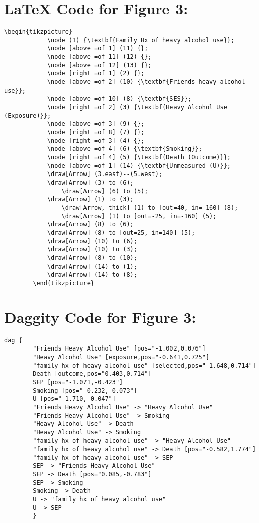 \documentclass{article}
\begin{document}
\section*{\LaTeX\hspace*{1mm} Code for Figure 3:}
    \begin{lstlisting}[frame=single, basicstyle=\ttfamily, linewidth=20.5cm]
        \begin{tikzpicture}
            \node (1) {\textbf{Family Hx of heavy alcohol use}};
            \node [above =of 1] (11) {};
            \node [above =of 11] (12) {};
            \node [above =of 12] (13) {};
            \node [right =of 1] (2) {};
            \node [above =of 2] (10) {\textbf{Friends heavy alcohol use}};
            \node [above =of 10] (8) {\textbf{SES}};
            \node [right =of 2] (3) {\textbf{Heavy Alcohol Use (Exposure)}};
            \node [above =of 3] (9) {};
            \node [right =of 8] (7) {};
            \node [right =of 3] (4) {};
            \node [above =of 4] (6) {\textbf{Smoking}};
            \node [right =of 4] (5) {\textbf{Death (Outcome)}};
            \node [above =of 1] (14) {\textbf{Unmeasured (U)}};
            \draw[Arrow] (3.east)--(5.west);
            \draw[Arrow] (3) to (6);
                \draw[Arrow] (6) to (5);
            \draw[Arrow] (1) to (3);
                \draw[Arrow, thick] (1) to [out=40, in=-160] (8);
                \draw[Arrow] (1) to [out=-25, in=-160] (5);
            \draw[Arrow] (8) to (6);
            \draw[Arrow] (8) to [out=25, in=140] (5);
            \draw[Arrow] (10) to (6);
            \draw[Arrow] (10) to (3);
            \draw[Arrow] (8) to (10);
            \draw[Arrow] (14) to (1);
            \draw[Arrow] (14) to (8);
        \end{tikzpicture}
\end{lstlisting}
   

\section*{Daggity Code for Figure 3:}
\begin{lstlisting}[frame=single, basicstyle=\ttfamily, linewidth=20.5cm]
    dag {
        "Friends Heavy Alcohol Use" [pos="-1.002,0.076"]
        "Heavy Alcohol Use" [exposure,pos="-0.641,0.725"]
        "family hx of heavy alcohol use" [selected,pos="-1.648,0.714"]
        Death [outcome,pos="0.403,0.714"]
        SEP [pos="-1.071,-0.423"]
        Smoking [pos="-0.232,-0.073"]
        U [pos="-1.710,-0.047"]
        "Friends Heavy Alcohol Use" -> "Heavy Alcohol Use"
        "Friends Heavy Alcohol Use" -> Smoking
        "Heavy Alcohol Use" -> Death
        "Heavy Alcohol Use" -> Smoking
        "family hx of heavy alcohol use" -> "Heavy Alcohol Use"
        "family hx of heavy alcohol use" -> Death [pos="-0.582,1.774"]
        "family hx of heavy alcohol use" -> SEP
        SEP -> "Friends Heavy Alcohol Use"
        SEP -> Death [pos="0.085,-0.783"]
        SEP -> Smoking
        Smoking -> Death
        U -> "family hx of heavy alcohol use"
        U -> SEP
        }        
\end{lstlisting}
\end{document}
